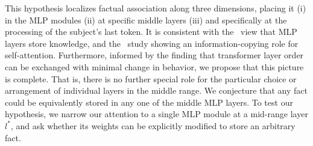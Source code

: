 This hypothesis localizes factual association along three dimensions, placing it (i) in the MLP modules (ii) at specific middle layers (iii) and specifically at the processing of the subject's last token.  It is consistent with the~\citet{geva-etal-2021-transformer} view that MLP layers store knowledge, and the~\citet{anthropic2021} study showing an information-copying role for self-attention.  Furthermore, informed  by the \citet{zhao2021non} finding that transformer layer order can be exchanged with minimal change in behavior, we propose that this picture is complete. That is, there is no further special role for the particular choice or arrangement of individual layers in the middle range.  We conjecture that any fact could be equivalently stored in any one of the middle MLP layers.
To test our hypothesis, we narrow our attention to a single MLP module at a mid-range layer $l^*$, and ask whether its weights can be explicitly modified to store an arbitrary fact.

